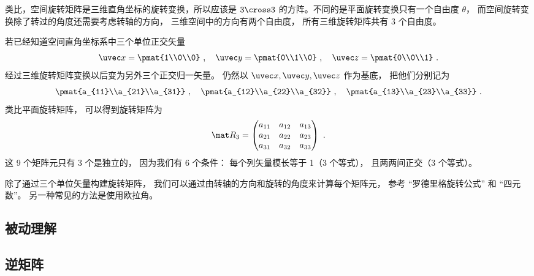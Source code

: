 
\begin{issues}
\issueDraft
\end{issues}


类比，空间旋转矩阵是三维直角坐标的旋转变换，所以应该是 $3 \cross 3$ 的方阵。不同的是平面旋转变换只有一个自由度 $\theta $， 而空间旋转变换除了转过的角度还需要考虑转轴的方向， 三维空间中的方向有两个自由度， 所有三维旋转矩阵共有 3 个自由度。

若已经知道空间直角坐标系中三个单位正交矢量
\begin{equation}
\uvec x=\pmat{1\\0\\0}~, \quad
\uvec y=\pmat{0\\1\\0}~, \quad
\uvec z=\pmat{0\\0\\1}~.
\end{equation}
经过三维旋转矩阵变换以后变为另外三个正交归一矢量。 仍然以 $\uvec x, \uvec y, \uvec z$ 作为基底， 把他们分别记为
\begin{equation}\label{eq_Rot3D_1}
\pmat{a_{11}\\a_{21}\\a_{31}} ~,\quad \pmat{a_{12}\\a_{22}\\a_{32}} ~,\quad \pmat{a_{13}\\a_{23}\\a_{33}}~.
\end{equation}
类比平面旋转矩阵， 可以得到旋转矩阵为
\begin{equation}
\mat R_3 = \begin{pmatrix}
{a_{11}}&{a_{12}}&{a_{13}}\\
{a_{21}}&{a_{22}}&{a_{23}}\\
{a_{31}}&{a_{32}}&{a_{33}}
\end{pmatrix}~.\end{equation}
这 9 个矩阵元只有 3 个是独立的， 因为我们有 6 个条件： 每个列矢量模长等于 1（3 个等式）， 且两两间正交（3 个等式）。

除了通过三个单位矢量构建旋转矩阵， 我们可以通过由转轴的方向和旋转的角度来计算每个矩阵元， 参考 “罗德里格旋转公式” 和 “四元数”。 另一种常见的方法是使用欧拉角。


\subsection{被动理解}


\subsection{逆矩阵}

